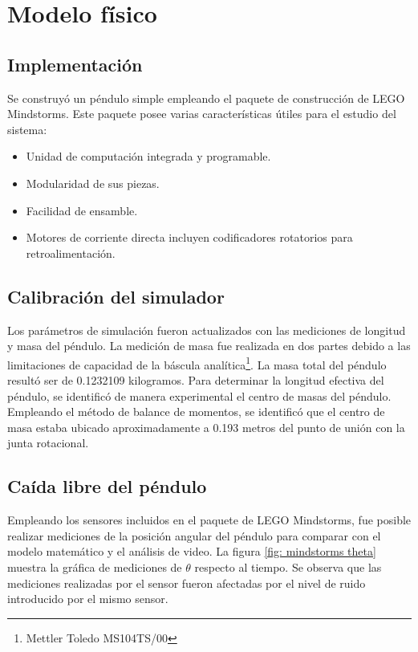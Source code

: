 \pagebreak

\section{Modelo físico}
\subsection{Implementación}

Se construyó un péndulo simple empleando 
el paquete de construcción de LEGO Mindstorms.
Este paquete posee varias características
útiles para el estudio del sistema:
\begin{itemize}
 \item Unidad de computación integrada y programable.
 \item Modularidad de sus piezas.
 \item Facilidad de ensamble.
 \item Motores de corriente directa incluyen 
 codificadores rotatorios para retroalimentación.
\end{itemize}

\subsection{Calibración del simulador}
Los parámetros de simulación fueron actualizados con las mediciones de
longitud y masa del péndulo.
La medición de masa fue realizada en dos partes debido a las limitaciones 
de capacidad de la báscula analítica\footnote{Mettler Toledo MS104TS/00}.
La masa total del péndulo resultó ser de 0.1232109 kilogramos.
Para determinar la longitud efectiva del péndulo, se identificó de manera 
experimental el centro de masas del péndulo.
Empleando el método de balance de momentos, se identificó que el 
centro de masa estaba ubicado aproximadamente a 0.193 metros 
del punto de unión con la junta rotacional.\\

\subsection{Caída libre del péndulo}

Empleando los sensores incluidos en el paquete de LEGO
Mindstorms, fue posible realizar mediciones de la 
posición angular del péndulo para comparar con el
modelo matemático y el análisis de video.
La figura \ref{fig: mindstorms theta} muestra la
gráfica de mediciones de $\theta$ respecto al tiempo.
Se observa que las mediciones realizadas por el sensor
fueron afectadas por el nivel de ruido introducido 
por el mismo sensor.

